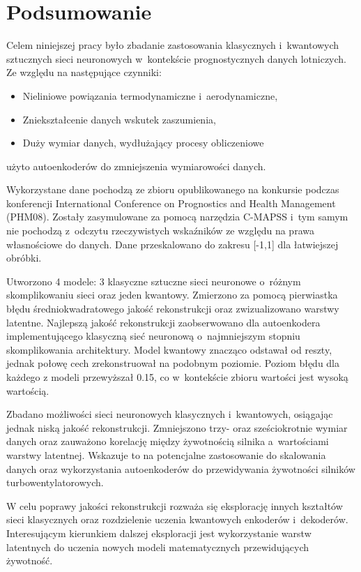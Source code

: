 \newpage
\section{Podsumowanie}

Celem niniejszej pracy było zbadanie zastosowania klasycznych i~kwantowych sztucznych sieci neuronowych w~kontekście prognostycznych danych lotniczych. Ze względu na następujące czynniki:
\begin{itemize}
    \item Nieliniowe powiązania termodynamiczne i~aerodynamiczne,
    \item Zniekształcenie danych wskutek zaszumienia,
    \item Duży wymiar danych, wydłużający procesy obliczeniowe
\end{itemize}
użyto autoenkoderów do zmniejszenia wymiarowości danych.

Wykorzystane dane pochodzą ze zbioru opublikowanego na konkursie podczas konferencji International Conference on Prognostics and Health Management (PHM08). Zostały zasymulowane za pomocą narzędzia C-MAPSS i~tym samym nie pochodzą z~odczytu rzeczywistych wskaźników ze względu na prawa własnościowe do danych. Dane przeskalowano do zakresu [-1,1] dla łatwiejszej obróbki.

Utworzono 4 modele: 3 klasyczne sztuczne sieci neuronowe o~różnym skomplikowaniu sieci oraz jeden kwantowy. Zmierzono za pomocą pierwiastka błędu średniokwadratowego jakość rekonstrukcji oraz zwizualizowano warstwy latentne.
Najlepszą jakość rekonstrukcji zaobserwowano dla autoenkodera implementującego klasyczną sieć neuronową o~najmniejszym stopniu skomplikowania architektury. Model kwantowy znacząco odstawał od reszty, jednak połowę cech zrekonstruował na podobnym poziomie. Poziom błędu dla każdego z modeli przewyższał 0.15, co w~kontekście zbioru wartości jest wysoką wartością.

Zbadano możliwości sieci neuronowych klasycznych i~kwantowych, osiągając jednak niską jakość rekonstrukcji. Zmniejszono trzy- oraz sześciokrotnie wymiar danych oraz zauważono korelację między żywotnością silnika a~wartościami warstwy latentnej. Wskazuje to na potencjalne zastosowanie do skalowania danych oraz wykorzystania autoenkoderów do przewidywania żywotności silników turbowentylatorowych. 

W celu poprawy jakości rekonstrukcji rozważa się eksplorację innych kształtów sieci klasycznych oraz rozdzielenie uczenia kwantowych enkoderów i~dekoderów. Interesującym kierunkiem dalszej eksploracji jest wykorzystanie warstw latentnych do uczenia nowych modeli matematycznych przewidujących żywotność.

